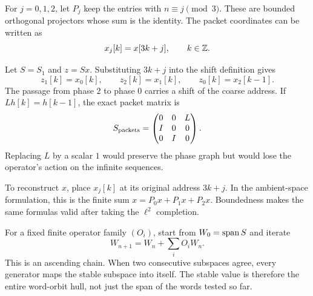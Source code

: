 
For $j=0,1,2$, let $P_j$ keep the entries with $n\equiv j\pmod3$. These are bounded orthogonal projectors whose sum is the identity. The packet coordinates can be written as
\[
x_j[k]=x[3k+j],\qquad k\in\mathbb Z.
\]


Let $S=S_1$ and $z=Sx$. Substituting $3k+j$ into the shift definition gives
\[
z_1[k]=x_0[k],\qquad z_2[k]=x_1[k],\qquad z_0[k]=x_2[k-1].
\]
The passage from phase $2$ to phase $0$ carries a shift of the coarse address. If $Lh[k]=h[k-1]$, the exact packet matrix is
\[
S_{\mathrm{packets}}=\begin{pmatrix}0&0&L\\I&0&0\\0&I&0\end{pmatrix}.
\]
Replacing $L$ by a scalar $1$ would preserve the phase graph but would lose the operator's action on the infinite sequences.

To reconstruct $x$, place $x_j[k]$ at its original address $3k+j$. In the ambient-space formulation, this is the finite sum $x=P_0x+P_1x+P_2x$. Boundedness makes the same formulas valid after taking the $\ell^2$ completion.


For a fixed finite operator family $(O_i)$, start from $W_0=\operatorname{span} S$ and iterate
\[
W_{n+1}=W_n+\sum_i O_iW_n.
\]
This is an ascending chain. When two consecutive subspaces agree, every generator maps the stable subspace into itself. The stable value is therefore the entire word-orbit hull, not just the span of the words tested so far.



